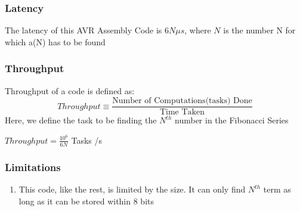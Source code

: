 \documentclass[titlepage, 11pt]{article}
\begin{document}
\subsubsection{Latency}
The latency of this AVR Assembly Code is $6N \mu s$, where $N$ is the number N for which a(N) has to be found

\subsubsection{Throughput}
Throughput of a code is defined as:
$$ Throughput \equiv \frac{\text{Number of Computations(tasks) Done}}{\text{Time Taken}}$$
Here, we define the task to be finding the $N^{th}$ number in the Fibonacci Series

$Throughput= \frac{10^6}{6N}$ Tasks /s

\subsubsection{Limitations}
\begin{enumerate}
\item This code, like the rest, is limited by the size. It can only find $N^{th}$ term as long as it can be stored within 8 bits
\end{enumerate}
\end{document}
